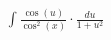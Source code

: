 \documentclass[preview]{standalone}
\begin{document}
\begin{align*}
\int \frac{\cos(u)}{\cos^2(x)} \cdot \frac{du}{1 + u^2}
\end{align*}
\end{document}

